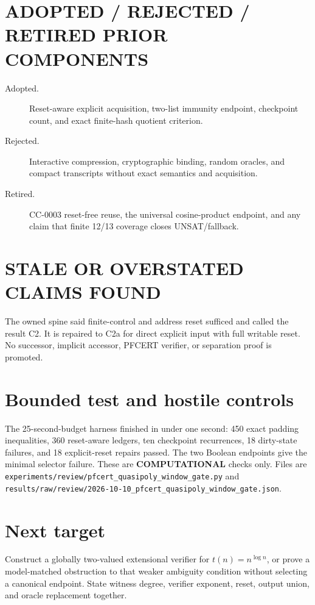 \documentclass[11pt]{article}
\begin{document}
\section{ADOPTED / REJECTED / RETIRED PRIOR COMPONENTS}
\begin{description}
\item[Adopted.] Reset-aware explicit acquisition, two-list immunity endpoint,
checkpoint count, and exact finite-hash quotient criterion.
\item[Rejected.] Interactive compression, cryptographic binding, random
oracles, and compact transcripts without exact semantics and acquisition.
\item[Retired.] CC-0003 reset-free reuse, the universal cosine-product
endpoint, and any claim that finite 12/13 coverage closes UNSAT/fallback.
\end{description}

\section{STALE OR OVERSTATED CLAIMS FOUND}
The owned spine said finite-control and address reset sufficed and called the
result C2.  It is repaired to C2a for direct explicit input with full
writable reset.  No successor, implicit accessor, PFCERT verifier, or
separation proof is promoted.

\section{Bounded test and hostile controls}
The 25-second-budget harness finished in under one second: 450 exact padding
inequalities, 360 reset-aware ledgers, ten checkpoint recurrences, 18
dirty-state failures, and 18 explicit-reset repairs passed.  The two Boolean
endpoints give the minimal selector failure.  These are
\textbf{COMPUTATIONAL} checks only.  Files are
\texttt{experiments/review/pfcert\_quasipoly\_window\_gate.py} and
\texttt{results/raw/review/2026-10-10\_pfcert\_quasipoly\_window\_gate.json}.

\section{Next target}
Construct a globally two-valued extensional verifier for
\(t(n)=n^{\log n}\), or prove a model-matched obstruction to that weaker
ambiguity condition without selecting a canonical endpoint.  State witness
degree, verifier exponent, reset, output union, and oracle replacement
together.
\end{document}
